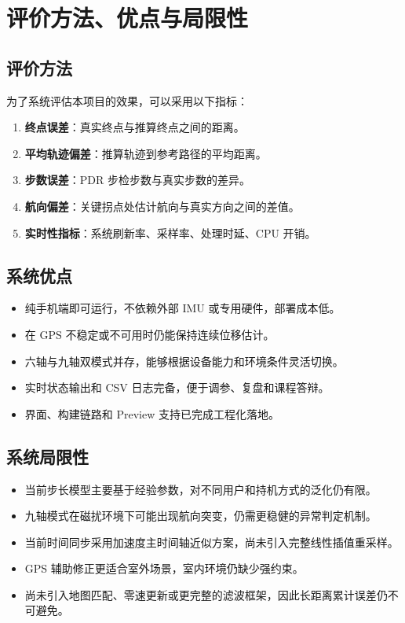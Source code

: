 \documentclass[12pt,a4paper]{ctexart}
\begin{document}
\section{评价方法、优点与局限性}
\subsection{评价方法}
为了系统评估本项目的效果，可以采用以下指标：

\begin{enumerate}
    \item \textbf{终点误差}：真实终点与推算终点之间的距离。
    \item \textbf{平均轨迹偏差}：推算轨迹到参考路径的平均距离。
    \item \textbf{步数误差}：PDR 步检步数与真实步数的差异。
    \item \textbf{航向偏差}：关键拐点处估计航向与真实方向之间的差值。
    \item \textbf{实时性指标}：系统刷新率、采样率、处理时延、CPU 开销。
\end{enumerate}

\subsection{系统优点}
\begin{itemize}
    \item 纯手机端即可运行，不依赖外部 IMU 或专用硬件，部署成本低。
    \item 在 GPS 不稳定或不可用时仍能保持连续位移估计。
    \item 六轴与九轴双模式并存，能够根据设备能力和环境条件灵活切换。
    \item 实时状态输出和 CSV 日志完备，便于调参、复盘和课程答辩。
    \item 界面、构建链路和 Preview 支持已完成工程化落地。
\end{itemize}

\subsection{系统局限性}
\begin{itemize}
    \item 当前步长模型主要基于经验参数，对不同用户和持机方式的泛化仍有限。
    \item 九轴模式在磁扰环境下可能出现航向突变，仍需更稳健的异常判定机制。
    \item 当前时间同步采用加速度主时间轴近似方案，尚未引入完整线性插值重采样。
    \item GPS 辅助修正更适合室外场景，室内环境仍缺少强约束。
    \item 尚未引入地图匹配、零速更新或更完整的滤波框架，因此长距离累计误差仍不可避免。
\end{itemize}
\end{document}
